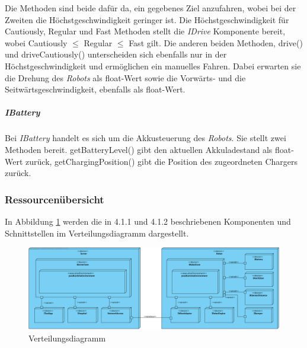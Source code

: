     		Die Methoden sind beide dafür da, ein gegebenes Ziel anzufahren, wobei bei der Zweiten die Höchstgeschwindigkeit geringer ist.
    		 Die Höchstgeschwindigkeit für Cautiously, Regular und Fast Methoden stellt die \emph{IDrive} Komponente bereit, wobei Cautiously $\leq$ Regular $\leq$ Fast gilt. 
    		 Die anderen beiden Methoden, drive() und driveCautiously() unterscheiden sich ebenfalls nur in der Höchstgeschwindigkeit und ermöglichen ein manuelles Fahren. 
    		 Dabei erwarten sie die Drehung des \emph{Robots} als float-Wert sowie die Vorwärts- und die Seitwärtsgeschwindigkeit, ebenfalls als float-Wert.
    	\subparagraph{IBattery}\label{ibattery}
    		Bei \emph{IBattery} handelt es sich um die Akkusteuerung des \emph{Robots}. 
    		Sie stellt zwei Methoden bereit. 
    		getBatteryLevel() gibt den aktuellen Akkuladestand als float-Wert zurück, getChargingPosition() gibt die Position des zugeordneten Chargers zurück.


\pagebreak
\subsubsection{Ressourcenübersicht}
    In Abbildung \ref{fig:4-1-3-verteilungsdiagramm} werden die in 4.1.1 und 4.1.2 beschriebenen
    Komponenten und Schnittstellen im Verteilungsdiagramm dargestellt.

    \begin{figure}[H]
      \centering
      \includegraphics[width=1.2\textwidth, angle=90]{img/2-Analyse-4-Produktumgebung}
      \caption{Verteilungsdiagramm}
      \label{fig:4-1-3-verteilungsdiagramm}
    \end{figure}
